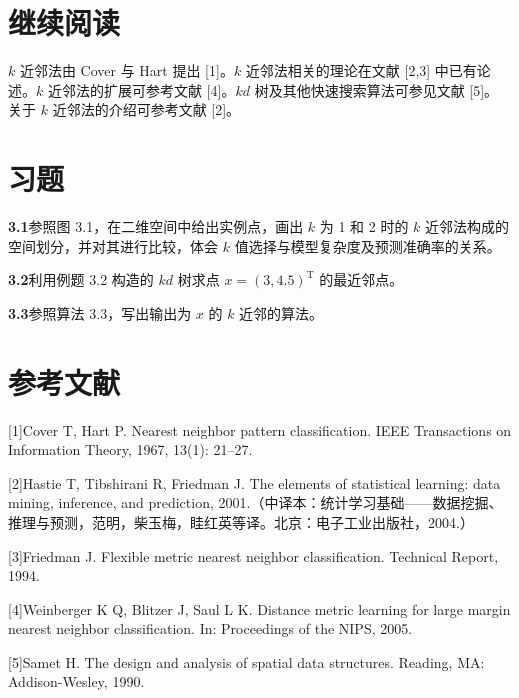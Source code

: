 \documentclass[UTF8, 12pt, fontset=fandol, oneside]{ctexart}
\begin{document}
\section*{继续阅读}

$k$ 近邻法由 Cover 与 Hart 提出 [1]。$k$ 近邻法相关的理论在文献 [2,3] 中已有论述。$k$ 近邻法的扩展可参考文献 [4]。$kd$ 树及其他快速搜索算法可参见文献 [5]。关于 $k$ 近邻法的介绍可参考文献 [2]。

\section*{习题}

\noindent\textbf{3.1}\quad 参照图 3.1，在二维空间中给出实例点，画出 $k$ 为 1 和 2 时的 $k$ 近邻法构成的空间划分，并对其进行比较，体会 $k$ 值选择与模型复杂度及预测准确率的关系。

\noindent\textbf{3.2}\quad 利用例题 3.2 构造的 $kd$ 树求点 $x=(3,4.5)^{\mathrm T}$ 的最近邻点。

\noindent\textbf{3.3}\quad 参照算法 3.3，写出输出为 $x$ 的 $k$ 近邻的算法。

\section*{参考文献}

[1]\quad Cover T, Hart P. Nearest neighbor pattern classification. IEEE Transactions on Information Theory, 1967, 13(1): 21--27.

[2]\quad Hastie T, Tibshirani R, Friedman J. The elements of statistical learning: data mining, inference, and prediction, 2001.（中译本：统计学习基础——数据挖掘、推理与预测，范明，柴玉梅，眭红英等译。北京：电子工业出版社，2004.）

[3]\quad Friedman J. Flexible metric nearest neighbor classification. Technical Report, 1994.

[4]\quad Weinberger K Q, Blitzer J, Saul L K. Distance metric learning for large margin nearest neighbor classification. In: Proceedings of the NIPS, 2005.

[5]\quad Samet H. The design and analysis of spatial data structures. Reading, MA: Addison-Wesley, 1990.
\end{document}
